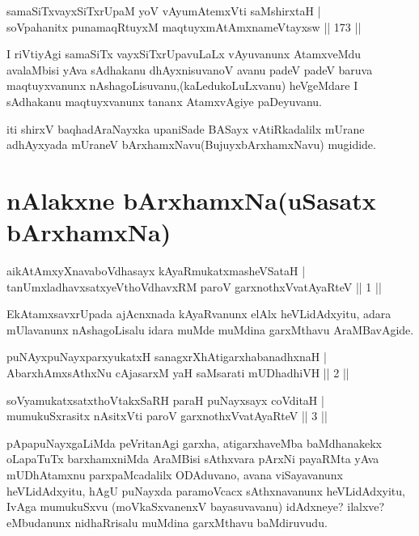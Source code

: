 
\begin{shl}
samaSiTxvayxSiTxrUpaM yoV vAyumAtemxVti saMshirxtaH |\\
soV\s pahanitx punamaqRtuyxM maqtuyxmAtAmxnameVtayxsw \hfill || 173 ||
\end{shl}

\begin{artha}
I riVtiyAgi samaSiTx vayxSiTxrUpavuLaLx vAyuvanunx AtamxveMdu avalaMbisi yAva sAdhakanu dhAyxnisuvanoV avanu padeV padeV baruva maqtuyxvanunx nAshagoLisuvanu,(kaLedukoLuLxvanu) heVgeMdare I sAdhakanu maqtuyxvanunx tananx AtamxvAgiye paDeyuvanu.
\end{artha}

\begin{center}
iti shirxV baqhadAraNayxka upaniSade BASayx vAtiRkadalilx mUrane adhAyxyada mUraneV bArxhamxNavu(BujuyxbArxhamxNavu) mugidide.
\end{center}

\section*{nAlakxne bArxhamxNa(uSasatx bArxhamxNa)}

\begin{shl}
aikAtAmxyXnavaboVdhasayx kAyaRmukatxmasheVSataH |\\
tanUmxladhavxsatxyeV\s thoVdhavxRM paroV garxnothxV\s vatAyaRteV \hfill || 1 ||
\end{shl}

\begin{artha}
EkAtamxsavxrUpada ajAcnxnada kAyaRvanunx elAlx heVLidAdxyitu, adara mUlavanunx nAshagoLisalu idara muMde muMdina garxMthavu AraMBavAgide.
\end{artha}

\begin{shl}
puNAyxpuNayxparxyukatxH sanagxrXhAtigarxhabanadhxnaH |\\
AbarxhAmx\s \s sAthxNu cAjasarxM yaH saMsarati mUDhadhiVH \hfill || 2 ||
\end{shl}

\begin{shl}
soV\s yamukatxsatxthoVtakxSaRH paraH puNayxsayx coVditaH |\\
mumukuSxrasitx nAsitxVti paroV garxnothxV\s vatAyaRteV \hfill || 3 ||
\end{shl}

\begin{artha}
pApapuNayxgaLiMda peVritanAgi garxha, atigarxhaveMba baMdhanakekx oLapaTuTx barxhamxniMda AraMBisi sAthxvara pArxNi payaRMta yAva mUDhAtamxnu parxpaMcadalilx ODAduvano, avana viSayavanunx heVLidAdxyitu, hAgU puNayxda paramoVcacx sAthxnavanunx heVLidAdxyitu, IvAga mumukuSxvu (moVkaSxvanenxV bayasuvavanu) idAdxneye? ilalxve? eMbudanunx nidhaRrisalu muMdina garxMthavu baMdiruvudu.
\end{artha}

